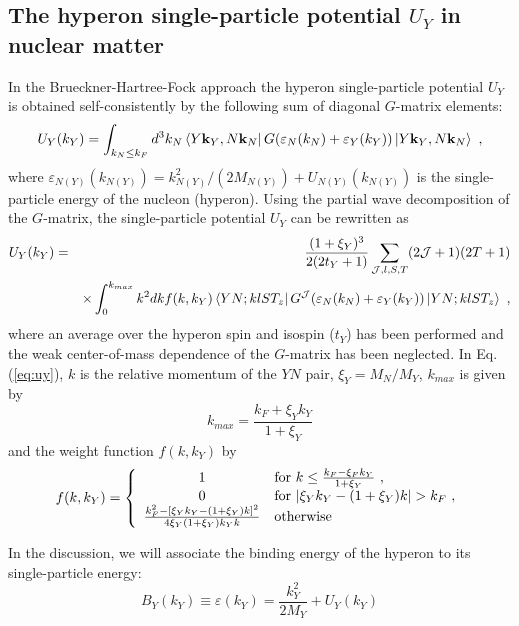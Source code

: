 \subsection{The hyperon single-particle potential $U_{Y}$ in nuclear matter}

In the Brueckner-Hartree-Fock approach 
the hyperon single-particle potential $U_{Y}$ is obtained
self-consistently by the following sum of
diagonal $G$-matrix elements:
\begin{equation}
     U_{Y}(k_{Y})=
   \int_{k_{N}\leq k_{F}}d^3k_{N}\left\langle Y{\bf k}_{Y},N{\bf k}_{N}\right
| G(\varepsilon_N(k_N)+\varepsilon_{Y}(k_Y))\left | Y{\bf
k}_{Y},N{\bf k}_{N}\right\rangle \ ,  
\end{equation} 
where $\varepsilon_{N(Y)} (k_{N(Y)}) = k_{N(Y)}^2/(2 M_{N(Y)}) +
U_{N(Y)}(k_{N(Y)})$ is
the single-particle energy of the nucleon (hyperon). Using the
partial wave decomposition of the $G$-matrix, the single-particle 
potential $U_Y$  can be rewritten as
\begin{eqnarray}
   U_{Y}(k_{Y})&=&
\frac{(1+\xi_{Y})^3}{2(2t_{Y}+1)}\sum_{{\cal J},l,S,T}(2{\cal J}+1)(2T+1) 
\nonumber \\
& & \times \int_{0}^{k_{max}}k^2dk f(k,k_{Y})
   \left\langle Y N; k lST_z\right | G^{\cal J}(\varepsilon_N(k_N)+\varepsilon_{Y}(k_Y))\left | 
Y N; klST_z\right\rangle  \ ,
\label{eq:uy}
\end{eqnarray}
where an average over the hyperon spin and isospin ($t_Y$) has been performed and the weak center-of-mass
dependence of the $G$-matrix has been neglected.
In Eq. (\ref{eq:uy}), $k$ is the relative momentum of the $YN$ pair, 
$\xi_Y=M_N/M_Y$, $k_{max}$ is given by
\begin{equation}
   k_{max} = \frac{k_{F}+\xi_{Y}k_{Y}}{1+\xi_{Y}} \nonumber  
\end{equation}
and the weight function $f(k,k_Y)$ by 
\begin{equation}
f(k,k_{Y})= \left\{ \begin{array}{cl} 1 & \mbox{for $ k\leq
\frac{k_{F}-\xi_{F}k_{Y}}{1+\xi_{Y}} $ }, \\ 0 & \mbox{for $
|\xi_{Y}k_{Y}-(1+\xi_{Y})k| > k_{F} $ }, \\
\frac{k_{F}^2-[\xi_{Y}k_{Y}-(1+\xi_{Y})k]^2}{4\xi_{Y}(1+\xi_{Y})k_{Y}k
} & \mbox{otherwise} 

\end{array} \right. \nonumber 
\end{equation} 

In the discussion, we will associate the binding energy of the
hyperon to its single-particle energy:
\begin{equation}
B_Y(k_Y)\equiv \varepsilon(k_Y)= \frac{k_Y^2}{2 M_Y} + U_Y(k_Y)
\label{eq:binding}
\end{equation}

